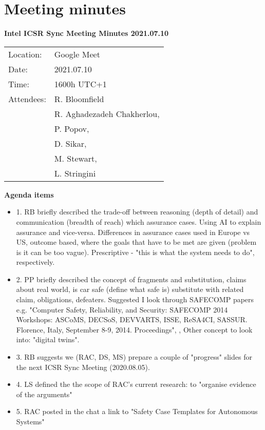 \chapter{Meeting minutes}

\label{Appendix-meeting-minutes} %


\large
\textbf{Intel ICSR Sync Meeting Minutes 2021.07.10}
\vspace{0.23cm}

\begin{tabular}{ll}
Location:  & Google Meet \\
Date: &  2021.07.10 \\ 
Time: & 1600h UTC+1 \\ 
Attendees: & R. Bloomfield \\
 & R. Aghadezadeh Chakherlou, \\
 & P. Popov, \\
 & D. Sikar, \\
 & M. Stewart,  \\
 & L. Stringini \\ 
\end{tabular}
\vspace{0.23cm}

\textbf{Agenda items}
\vspace{0.23cm}

\begin{itemize}
    \item 1. RB briefly described the trade-off between reasoning (depth of detail) and communication (breadth of reach) which assurance cases. Using AI to explain assurance and vice-versa. Differences in assurance cases used in Europe vs US, outcome based, where the goals that have to be met are given (problem is it can be too vague). Prescriptive - "this is what the system needs to do", respectively.
    \item 2. PP briefly described the concept of fragments and substitution, claims about real world, is car safe (define what safe is) substitute with related claim, obligations, defeaters. Suggested I look through SAFECOMP papers e.g. "Computer Safety, Reliability, and Security: SAFECOMP 2014 Workshops: ASCoMS, DECSoS, DEVVARTS, ISSE, ReSA4CI, SASSUR. Florence, Italy, September 8-9, 2014. Proceedings", , Other concept to look into: "digital twins".
    \item 3. RB suggests we (RAC, DS, MS) prepare a couple of "progress" slides for the next ICSR Sync Meeting (2020.08.05).
    \item 4. LS defined the the scope of RAC's current research: to "organise evidence of the arguments"
    \item 5. RAC posted in the chat a link to "Safety Case Templates for Autonomous Systems" 
\end{itemize}

